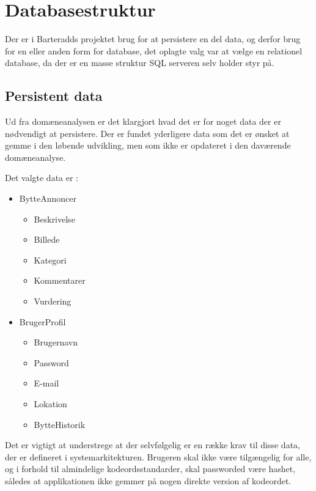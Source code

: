 \section{Databasestruktur}
Der er i Barteradds projektet brug for at persistere en del data, og derfor brug for en eller anden form for database, det oplagte valg var at vælge en relationel database, da der er en masse struktur SQL serveren selv holder styr på.

\subsection{Persistent data}
Ud fra domæneanalysen er det klargjort hvad det er for noget data der er nødvendigt at persistere. Der er fundet yderligere data som det er ønsket at gemme i den løbende udvikling, men som ikke er opdateret i den daværende domæneanalyse.

Det valgte data er :
\begin{itemize}
	\item BytteAnnoncer
	\begin{itemize}
		\item Beskrivelse 
		\item Billede 
		\item Kategori
		\item Kommentarer
		\item Vurdering
	\end{itemize}
	\item BrugerProfil
	\begin{itemize}
		\item Brugernavn
		\item Password
		\item E-mail
		\item Lokation
		\item BytteHistorik
	\end{itemize}
\end{itemize} 

Det er vigtigt at understrege at der selvfølgelig er en række krav til disse data, der er defineret i systemarkitekturen. Brugeren skal ikke være tilgængelig for alle, og i forhold til almindelige kodeordsstandarder, skal passworded være hashet, således at applikationen ikke gemmer på nogen direkte version af kodeordet. 

